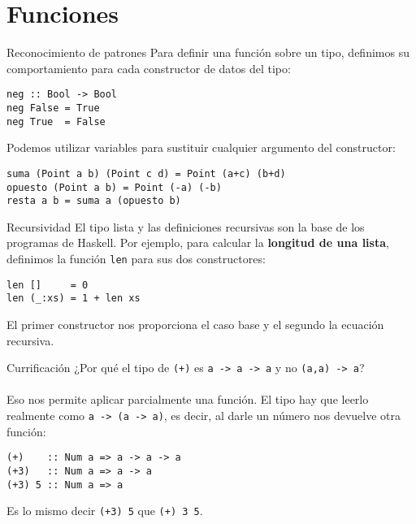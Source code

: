 \section{Funciones}

\begin{frame}[fragile]{Reconocimiento de patrones}
  Para definir una función sobre un tipo, definimos su comportamiento para cada
  constructor de datos del tipo:

  \espacio

  \begin{lstlisting}
neg :: Bool -> Bool
neg False = True
neg True  = False
  \end{lstlisting}

  \espacio

  Podemos utilizar variables para sustituir cualquier argumento del constructor:

  \espacio

  \begin{lstlisting}
suma (Point a b) (Point c d) = Point (a+c) (b+d)
opuesto (Point a b) = Point (-a) (-b)
resta a b = suma a (opuesto b)
  \end{lstlisting}
\end{frame}

\begin{frame}[fragile]{Recursividad}
  El tipo lista y las definiciones recursivas son la base de los programas de Haskell.
  Por ejemplo, para calcular la \textbf{longitud de una lista}, definimos la función
  \texttt{len} para sus dos constructores:

  \espacio

  \begin{lstlisting}
len []     = 0
len (_:xs) = 1 + len xs
  \end{lstlisting}

    \espacio

  El primer constructor nos proporciona el caso base y el segundo la ecuación recursiva.
\end{frame}

\begin{frame}[fragile]{Currificación}
  ¿Por qué el tipo de \texttt{(+)} es \texttt{a -> a -> a} y no
   \texttt{(a,a) -> a}?
  \\~\\
  Eso nos permite aplicar parcialmente una función. El tipo hay que leerlo realmente como
  \texttt{a -> (a -> a)}, es decir, al darle un número nos devuelve otra función:
    \begin{lstlisting}
(+)    :: Num a => a -> a -> a
(+3)   :: Num a => a -> a
(+3) 5 :: Num a => a
  \end{lstlisting}
  Es lo mismo decir \texttt{(+3) 5} que \texttt{(+) 3 5}.
\end{frame}


